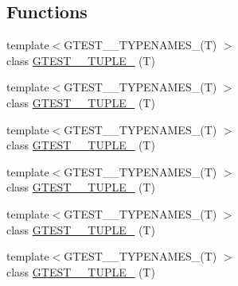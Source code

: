 \subsection*{\-Functions}
\begin{DoxyCompactItemize}
\item 
{\footnotesize template$<$\-G\-T\-E\-S\-T\-\_\-\_\-\-T\-Y\-P\-E\-N\-A\-M\-E\-S\-\_\-(\-T) $>$ }\\class \hyperlink{namespacestd_1_1tr1_a7d3ef0be78d2fa7ce4f891fc430349de}{\-G\-T\-E\-S\-T\-\_\-\_\-\-T\-U\-P\-L\-E\-\_\-} (\-T)
\item 
{\footnotesize template$<$\-G\-T\-E\-S\-T\-\_\-\_\-\-T\-Y\-P\-E\-N\-A\-M\-E\-S\-\_\-(\-T) $>$ }\\class \hyperlink{namespacestd_1_1tr1_a602c4c215cc7dd23029b433bfd49b158}{\-G\-T\-E\-S\-T\-\_\-\_\-\-T\-U\-P\-L\-E\-\_\-} (\-T)
\item 
{\footnotesize template$<$\-G\-T\-E\-S\-T\-\_\-\_\-\-T\-Y\-P\-E\-N\-A\-M\-E\-S\-\_\-(\-T) $>$ }\\class \hyperlink{namespacestd_1_1tr1_adc09679207a98aabaf26b2e2d1a897de}{\-G\-T\-E\-S\-T\-\_\-\_\-\-T\-U\-P\-L\-E\-\_\-} (\-T)
\item 
{\footnotesize template$<$\-G\-T\-E\-S\-T\-\_\-\_\-\-T\-Y\-P\-E\-N\-A\-M\-E\-S\-\_\-(\-T) $>$ }\\class \hyperlink{namespacestd_1_1tr1_a6fbbb3cad4785cce169500d136cd57ea}{\-G\-T\-E\-S\-T\-\_\-\_\-\-T\-U\-P\-L\-E\-\_\-} (\-T)
\item 
{\footnotesize template$<$\-G\-T\-E\-S\-T\-\_\-\_\-\-T\-Y\-P\-E\-N\-A\-M\-E\-S\-\_\-(\-T) $>$ }\\class \hyperlink{namespacestd_1_1tr1_a16f0657a20c8844526b4b1fdc1a0f8ba}{\-G\-T\-E\-S\-T\-\_\-\_\-\-T\-U\-P\-L\-E\-\_\-} (\-T)
\item 
{\footnotesize template$<$\-G\-T\-E\-S\-T\-\_\-\_\-\-T\-Y\-P\-E\-N\-A\-M\-E\-S\-\_\-(\-T) $>$ }\\class \hyperlink{namespacestd_1_1tr1_a20a5b5a64309a5069e20428dcc3b5217}{\-G\-T\-E\-S\-T\-\_\-\_\-\-T\-U\-P\-L\-E\-\_\-} (\-T)

\end{DoxyCompactItemize}
